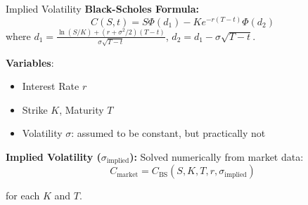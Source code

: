 \documentclass{beamer}
\begin{document}
\begin{frame}{Implied Volatility}
\textbf{Black-Scholes Formula:} 
\[
C(S, t) = S \Phi(d_1) - K e^{-r(T-t)} \Phi(d_2)
\]
where \(d_1 = \frac{\ln(S/K) + (r + \sigma^2/2)(T-t)}{\sigma\sqrt{T-t}}\), \(d_2 = d_1 - \sigma\sqrt{T-t}\).\\
\vspace{0.3cm}

\textbf{Variables}: 
\begin{itemize}
    \item Interest Rate $r$
    \item Strike $K$, Maturity $T$
    \item Volatility $\sigma$: assumed to be constant, but practically not
\end{itemize}
\textbf{Implied Volatility (\(\sigma_{\text{implied}}\)):} Solved numerically from market data:
\[
C_{\text{market}} = C_{\text{BS}}(S, K, T, r, \sigma_{\text{implied}})
\]

for each $K$ and $T$.
\end{frame}
\end{document}
